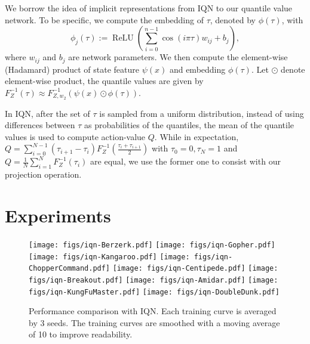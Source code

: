 \documentclass{article}
\begin{document}
We borrow the idea of implicit representations from IQN to our quantile value network. To be specific, we compute the embedding of $\tau$, denoted by $\phi(\tau)$, with 
\begin{equation*}
    \phi_{j}(\tau) :=\operatorname{ReLU}\left(\sum_{i=0}^{n-1} \cos (i\pi \tau) w_{i j}+b_{j}\right),
\end{equation*}
where $w_{ij}$ and $b_j$ are network parameters. We then compute the element-wise (Hadamard) product of state feature $\psi(x)$ and embedding $\phi(\tau)$. Let $\odot$ denote element-wise product, the quantile values are given by $F^{-1}_Z(\tau)\approx F^{-1}_{Z,w_2}(\psi(x)\odot \phi(\tau))$.

In IQN, after the set of $\tau$ is sampled from a uniform distribution, instead of using differences between $\tau$ as probabilities of the quantiles, the mean of the quantile values is used to compute action-value $Q$. While in expectation, $Q=\sum_{i=0}^{N-1}(\tau_{i+1}-\tau_{i})F^{-1}_{Z}(\frac{\tau_i+\tau_{i+1}}{2})$ with $\tau_0=0, \tau_{N}=1$ and $Q=\frac{1}{N}\sum_{i=1}^{N}F^{-1}_{Z}(\tau_i)$ are equal, we use the former one to consist with our projection operation.

\section{Experiments}

\begin{figure*}[t!]
    \centering
    \texttt{[image: figs/iqn-Berzerk.pdf]}
    \texttt{[image: figs/iqn-Gopher.pdf]}
    \texttt{[image: figs/iqn-Kangaroo.pdf]}
    \texttt{[image: figs/iqn-ChopperCommand.pdf]}
    \texttt{[image: figs/iqn-Centipede.pdf]}
    \texttt{[image: figs/iqn-Breakout.pdf]}
    \texttt{[image: figs/iqn-Amidar.pdf]}
    \texttt{[image: figs/iqn-KungFuMaster.pdf]}
    \texttt{[image: figs/iqn-DoubleDunk.pdf]}

    \caption{Performance comparison with IQN. Each training curve is averaged by 3 seeds. The training curves are smoothed with a moving average of 10 to improve readability.}
    \label{curve}
\end{figure*}
\end{document}
